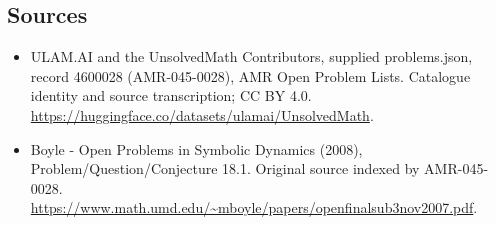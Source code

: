 \documentclass[11pt,a4paper]{article}
\begin{document}
\subsection{Sources}
\begin{itemize}
\item[S1] ULAM.AI and the UnsolvedMath Contributors, supplied problems.json, record 4600028 (AMR-045-0028), AMR Open Problem Lists. Catalogue identity and source transcription; CC BY 4.0.
\url{https://huggingface.co/datasets/ulamai/UnsolvedMath}.
\item[S2] Boyle - Open Problems in Symbolic Dynamics (2008), Problem/Question/Conjecture 18.1. Original source indexed by AMR-045-0028.
\url{https://www.math.umd.edu/~mboyle/papers/openfinalsub3nov2007.pdf}.
\end{itemize}
\end{document}
